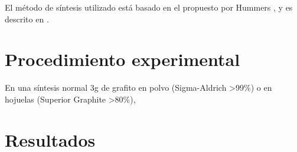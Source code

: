 El método de síntesis utilizado está basado en el propuesto por Hummers \citep{Hummers1958}, y es descrito en \citep{Abdolhosseinzadeh2015}.
\section{Procedimiento experimental}
En una síntesis normal 3g de grafito en polvo (Sigma-Aldrich >99\%) o en hojuelas (Superior Graphite >80\%), 

\section{Resultados}